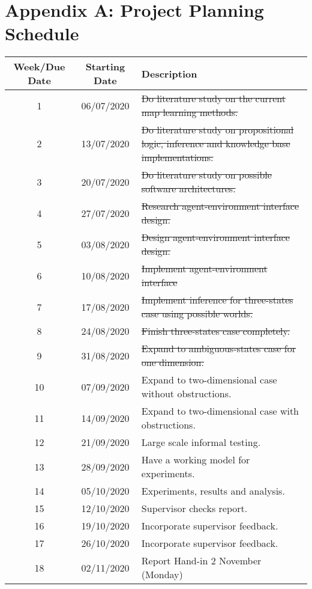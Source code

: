 \setcounter{table}{0}
\renewcommand{\thetable}{A.\arabic{table}}

\chapter{Appendix A:  Project Planning Schedule}

 \begin{table}[H]
  \begin{center}
    \begin{tabular}{|c|c|p{8cm}|} 
    \hline
      \textbf{Week/Due Date} & \textbf{Starting Date} & \textbf{Description}\\
      \hline
      \hline
      1 & 06/07/2020 & \sout{Do literature study on the current map learning methods.}\\ \hline
      
      2 & 13/07/2020 & \sout{Do literature study on propositional logic, 
      inference and knowledge base implementations.}\\ \hline
      
      3 & 20/07/2020 & \sout{Do literature study on possible software architectures.}\\ \hline
      
      4 & 27/07/2020 &  \sout{Research agent-environment interface design.} \\ \hline
      
      5  & 03/08/2020 & \sout{Design agent-environment interface design.}  \\ \hline
      
      6 & 10/08/2020 & \sout{Implement agent-environment interface}\\ \hline
      
      7 & 17/08/2020 & \sout{Implement inference for three-states case using possible worlds.} \\ \hline
      
      8 & 24/08/2020 & \sout{Finish three-states case completely.}\\ \hline
      
      9 & 31/08/2020 & \sout{Expand to ambiguous-states case for one dimension.}\\ \hline
      10 & 07/09/2020 & Expand to two-dimensional case without obstructions.\\ \hline
      11 & 14/09/2020 & Expand to two-dimensional case with obstructions.\\ \hline
      12 & 21/09/2020 & Large scale informal testing.\\ \hline
      13 & 28/09/2020 & Have a working model for experiments.\\ \hline
      14 & 05/10/2020 & Experiments, results and analysis.\\ \hline
      15 & 12/10/2020 & Supervisor checks report.\\ \hline
      16 & 19/10/2020 & Incorporate supervisor feedback.\\ \hline
      17 & 26/10/2020 & Incorporate supervisor feedback.\\ \hline
      18 & 02/11/2020 &  Report Hand-in 2 November (Monday)\\ 
      

\end{tabular}
\end{center}
\end{table}
